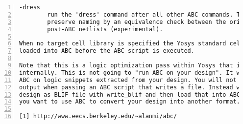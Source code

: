 \begin{lstlisting}[numbers=left,frame=single]
    -dress
        run the 'dress' command after all other ABC commands. This aims to
        preserve naming by an equivalence check between the original and
        post-ABC netlists (experimental).

When no target cell library is specified the Yosys standard cell library is
loaded into ABC before the ABC script is executed.

Note that this is a logic optimization pass within Yosys that is calling ABC
internally. This is not going to "run ABC on your design". It will instead run
ABC on logic snippets extracted from your design. You will not get any useful
output when passing an ABC script that writes a file. Instead write your full
design as BLIF file with write_blif and then load that into ABC externally if
you want to use ABC to convert your design into another format.

[1] http://www.eecs.berkeley.edu/~alanmi/abc/
\end{lstlisting}

